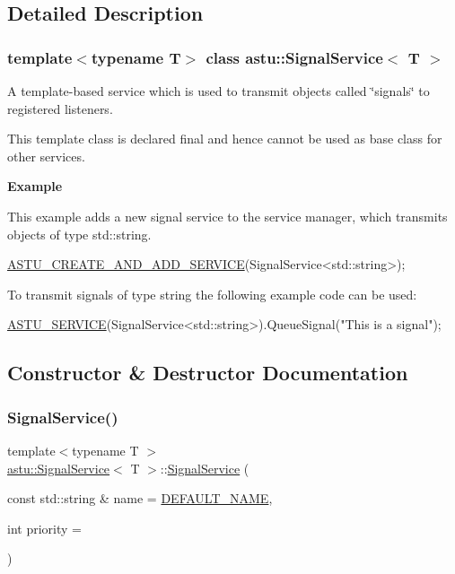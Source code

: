 \subsection{Detailed Description}
\subsubsection*{template$<$typename T$>$\newline
class astu\+::\+Signal\+Service$<$ T $>$}

A template-\/based service which is used to transmit objects called \char`\"{}signals\char`\"{} to registered listeners.

This template class is declared final and hence cannot be used as base class for other services.

{\bfseries Example}

This example adds a new signal service to the service manager, which transmits objects of type std\+::string.


\begin{DoxyCode}
\hyperlink{group__srv__group_ga91256015ad12618b8eda42106056a927}{ASTU\_CREATE\_AND\_ADD\_SERVICE}(SignalService<std::string>);
\end{DoxyCode}


To transmit signals of type string the following example code can be used\+:


\begin{DoxyCode}
\hyperlink{group__srv__group_ga42575546f01bf92989d08916564ffc66}{ASTU\_SERVICE}(SignalService<std::string>).QueueSignal(\textcolor{stringliteral}{"This is a signal"});
\end{DoxyCode}
 

\subsection{Constructor \& Destructor Documentation}
\mbox{\label{classastu_1_1SignalService_acf4e3bfbacc9eb6654a84d59b3ff1a6a}} 
\subsubsection{\texorpdfstring{Signal\+Service()}{SignalService()}}
{\footnotesize\ttfamily template$<$typename T $>$ \\
\hyperlink{classastu_1_1SignalService}{astu\+::\+Signal\+Service}$<$ T $>$\+::\hyperlink{classastu_1_1SignalService}{Signal\+Service} (\begin{DoxyParamCaption}\item[{const std\+::string \&}]{name = {\ttfamily \hyperlink{classastu_1_1Service_a8bb66bb984aa9490026232b193896634}{D\+E\+F\+A\+U\+L\+T\+\_\+\+N\+A\+ME}},  }\item[{int}]{priority = {} }\end{DoxyParamCaption})\hspace{0.3cm}{\ttfamily [inline]}}

